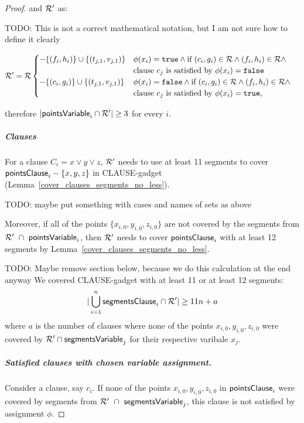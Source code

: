 \begin{proof}
and $\mathcal{R}'$ as:

TODO: This is not a correct mathematical notation, but I am not sure
how to define it clearly

\begin{align}
\mathcal{R}' = \mathcal{R} 
	\begin{split}
	& \begin{cases}
	- \{ (f_{i}, h_{i}) \} \cup \{ (t_{j, 1}, v_{j, 1}) \}
	& \phi(x_i) = \texttt{true} \land \text{if}\ (c_{i}, g_{i}) \in \mathcal{R} \land (f_{i}, h_{i}) \in \mathcal{R} \land \\
	& \text{clause } c_j \text{ is satisfied by } \phi(x_i) = \texttt{false} \\
	- \{ (c_{i}, g_{i}) \} \cup \{ (t_{j, 1}, v_{j, 1}) \}
	& \phi(x_i) = \texttt{false} \land \text{if}\ (c_{i}, g_{i}) \in \mathcal{R} \land (f_{i}, h_{i}) \in \mathcal{R} \land \\
	& \text{clause } c_j \text{ is satisfied by } \phi(x_i) = \texttt{true}, \\
	\end{cases}
	\end{split}
\end{align}

therefore $|\mathsf{pointsVariable}_{i} \cap \mathcal{R}'| \ge 3$ for every $i$.

\subparagraph{Clauses}

For a clause $C_i = x \lor y \lor z$,
$\mathcal{R}'$ needs to use at least 11 segments to cover $\mathsf{pointsClause}_i - \{x, y, z\}$
in CLAUSE-gadget (Lemma~\ref{cover_clauses_segments_no_less}).

TODO: maybe put something with cases and names of sets as above

Moreover, if all of the points $\{x_{i,0}, y_{i,0}, z_{i,0}\}$
are not covered by the segments from $\mathcal{R}'~\cap~\mathsf{pointsVariable}_{i}$,
then $\mathcal{R}'$ needs to cover $\mathsf{pointsClause}_i$
with at least 12 segments
by Lemma~\ref{cover_clauses_segments_no_less}.


TODO: Maybe remove section below, because we do this calculation at the end anyway
We covered CLAUSE-gadget with at least 11 or at least 12 segments:
$$|\bigcup\limits_{i=1}^n \mathsf{segmentsClause}_i \cap \mathcal{R}'| \ge 11n + a$$
where $a$ is the number of clauses
where none of the points $x_{i,0}, y_{i,0}, z_{i,0}$
were covered by $\mathcal{R}' \cap \mathsf{segmentsVariable}_{j}$ for their respective
varibale $x_j$.

\subparagraph{Satisfied clauses with chosen variable assignment.}

Consider a clause, say $c_i$. If none of
the points $x_{i,0}, y_{i,0}, z_{i,0}$ in $\mathsf{pointsClause}_i$ were covered by
segments from $\mathcal{R}'~\cap~\mathsf{segmentsVariable}_{j}$,
this clause is not satisfied by assignment $\phi$.


\end{proof}
